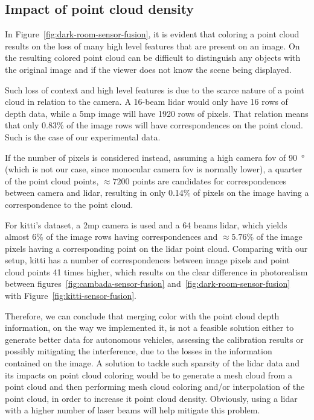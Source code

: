 \subsection{Impact of point cloud density}
In Figure~\ref{fig:dark-room-sensor-fusion}, it is evident that coloring a point cloud results on the loss of many high level features that are present on an image. On the resulting colored point cloud can be difficult to distinguish any objects with the original image and if the viewer does not know the scene being displayed.

Such loss of context and high level features is due to the scarce nature of a point cloud in relation to the camera. A 16-beam \ac{lidar} would only have 16 rows of depth data, while a 5\ac{mp} image will have 1920 rows of pixels. That relation means that only 0.83\% of the image rows will have correspondences on the point cloud. Such is the case of our experimental data.

If the number of pixels is considered instead, assuming a high camera \ac{fov} of \SI{90}{\degree} (which is not our case, since monocular camera \ac{fov} is normally lower), a quarter of the point cloud points, $\approx 7200$ points are candidates for correspondences between camera and \ac{lidar}, resulting in only 0.14\% of pixels on the image having a correspondence to the point cloud. 

For \ac{kitti}'s dataset, a 2\ac{mp} camera is used and a 64 beams \ac{lidar}, which yields almost 6\% of the image rows having correspondences and $\approx 5.76\%$ of the image pixels having a corresponding point on the \ac{lidar} point cloud. Comparing with our setup, \ac{kitti} has a number of correspondences between image pixels and point cloud points 41 times higher, which results on the clear difference in photorealism between figures~\ref{fig:cambada-sensor-fusion} and~\ref{fig:dark-room-sensor-fusion} with Figure~\ref{fig:kitti-sensor-fusion}.

Therefore, we can conclude that merging color with the point cloud depth information, on the way we implemented it, is not a feasible solution either to generate better data for autonomous vehicles, assessing the calibration results or possibly mitigating the interference, due to the losses in the information contained on the image. A solution to tackle such sparsity of the \ac{lidar} data and its impacts on point cloud coloring would be to generate a mesh cloud  from a point cloud and then performing mesh cloud coloring and/or interpolation of the point cloud, in order to increase it point cloud density. Obviously, using a \ac{lidar} with a higher number of laser beams will help mitigate this problem.

